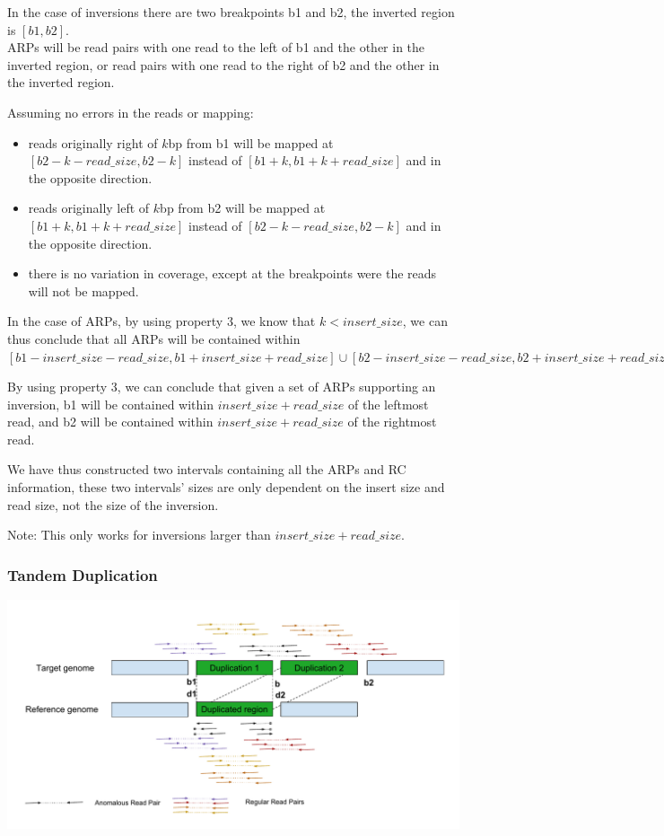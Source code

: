 \documentclass{article}
\begin{document}
In the case of inversions there are two breakpoints b1 and b2, the inverted region is $[b1, b2]$.\\
ARPs will be read pairs with one read to the left of b1 and the other in the inverted region, or read pairs with one read to the right of b2 and the other in the inverted region.

Assuming no errors in the reads or mapping:
\begin{itemize}
    \item reads originally right of $k$bp from b1 will be mapped at $[b2 - k - read\_size, b2 - k]$ instead of $[b1 + k, b1 + k + read\_size]$ and in the opposite direction.
    \item reads originally left of $k$bp from b2 will be mapped at $[b1 + k, b1 + k + read\_size]$ instead of $[b2 - k - read\_size, b2 - k]$ and in the opposite direction.
    \item there is no variation in coverage, except at the breakpoints were the reads will not be mapped.
\end{itemize}


In the case of ARPs, by using property 3, we know that $k < insert\_size$, we can thus conclude that all ARPs will be contained within $[b1 - insert\_size - read\_size, b1 + insert\_size + read\_size] \cup [b2 - insert\_size - read\_size, b2 + insert\_size + read\_size]$

By using property 3, we can conclude that given a set of ARPs supporting an inversion, b1 will be contained within $insert\_size + read\_size$ of the leftmost read, and b2 will be contained within $insert\_size + read\_size$ of the rightmost read.

We have thus constructed two intervals containing all the ARPs and RC information, these two intervals' sizes are only dependent on the insert size and read size, not the size of the inversion. 

Note: This only works for inversions larger than $insert\_size + read\_size$.

\subsubsection{Tandem Duplication}

\includegraphics[width=\textwidth]{DuplicationReadPairs}
\end{document}
